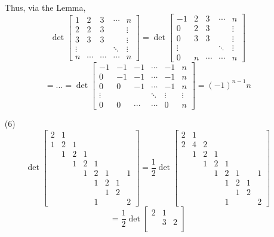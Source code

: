 \begin{itemize}
Thus, via the Lemma,
$$\det\begin{bmatrix}
1 & 2 & 3 & \cdots & n \\
2 & 2 & 3 & & \vdots \\
3 & 3 & 3 & & \vdots \\
\vdots & & & \ddots & \vdots \\
n & \cdots & \cdots & \cdots & n
\end{bmatrix} = \det\begin{bmatrix}
-1 & 2 & 3 & \cdots & n \\
0 & 2 & 3 & & \vdots \\
0 & 3 & 3 & & \vdots \\
\vdots & & & \ddots & \vdots \\
0 & n & \cdots & \cdots & n
\end{bmatrix}$$
$$= ... = \det\begin{bmatrix}
-1 & -1 & -1 & \cdots & -1 & n \\
0 & -1 & -1 & \cdots & -1 & n \\
0 & 0 & -1 & \cdots & -1 & n \\
\vdots & & & \ddots & \vdots & \vdots \\
0 & 0 & \cdots & \cdots & 0 & n
\end{bmatrix} = (-1)^{n-1}n$$
\item[(6)]
$$\det\begin{bmatrix}
2 & 1 \\
1 & 2 & 1 \\
& 1 & 2 & 1 \\
& & 1 & 2 & 1 \\
& & & 1 & 2 & 1 & & 1\\
& & & & 1 & 2 & 1 \\
& & & & & 1 & 2 \\
& & & & 1 & & & 2
\end{bmatrix} = \frac{1}{2}\det\begin{bmatrix}
2 & 1 \\
2 & 4 & 2 \\
& 1 & 2 & 1 \\
& & 1 & 2 & 1 \\
& & & 1 & 2 & 1 & & 1\\
& & & & 1 & 2 & 1 \\
& & & & & 1 & 2 \\
& & & & 1 & & & 2
\end{bmatrix}$$
$$= \frac{1}{2}\det\begin{bmatrix}
2 & 1 \\
& 3 & 2 \\

\end{bmatrix}$$
\end{itemize}
